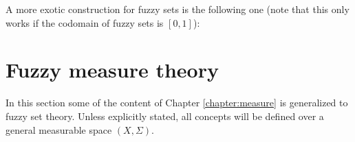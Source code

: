     A more exotic construction for fuzzy sets is the following one (note that this only works if the codomain of fuzzy sets is $[0,1]$):

\section{Fuzzy measure theory}

    In this section some of the content of Chapter \ref{chapter:measure} is generalized to fuzzy set theory. Unless explicitly stated, all concepts will be defined over a general measurable space $(X,\Sigma)$.

